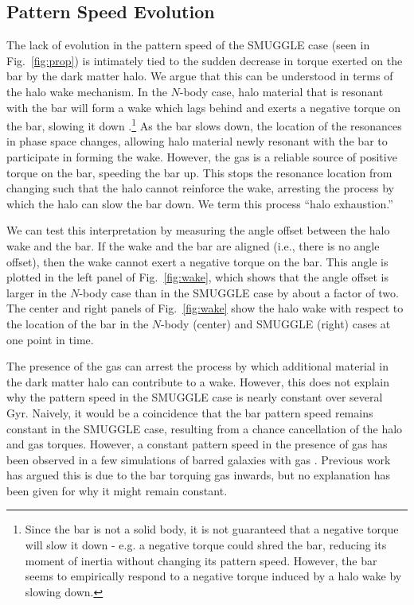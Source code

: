\documentclass[fleqn,usenatbib]{mnras}
\newcommand{\Nbody}{$N$-body}
\begin{document}
\subsection{Pattern Speed Evolution}
The lack of evolution in the pattern speed of the SMUGGLE case (seen in
Fig.~\ref{fig:prop}) is intimately tied to the sudden decrease in torque exerted
on the bar by the dark matter halo. We argue that this can be understood in
terms of the halo wake mechanism. In the \Nbody{} case, halo material that is
resonant with the bar will form a wake which lags behind and exerts a negative
torque on the bar, slowing it down \citep{1984MNRAS.209..729T,
1985MNRAS.213..451W, 1992ApJ...400...80H}.\footnote{Since the bar is not a solid
body, it is not guaranteed that a negative torque will slow it down - e.g. a
negative torque could shred the bar, reducing its moment of inertia without
changing its pattern speed. However, the bar seems to empirically respond to a
negative torque induced by a halo wake by slowing down.} As the bar slows down,
the location of the resonances in phase space changes, allowing halo material
newly resonant with the bar to participate in forming the wake. However, the gas
is a reliable source of positive torque on the bar, speeding the bar up. This
stops the resonance location from changing such that the halo cannot reinforce
the wake, arresting the process by which the halo can slow the bar down. We term
this process ``halo exhaustion.''

We can test this interpretation by measuring the angle offset between the halo
wake and the bar. If the wake and the bar are aligned (i.e., there is no angle
offset), then the wake cannot exert a negative torque on the bar. This angle
is plotted in the left panel of Fig.~\ref{fig:wake}, which shows that the
angle offset is larger in the \Nbody{} case than in the SMUGGLE case by about a
factor of two. The center and right panels of Fig.~\ref{fig:wake} show the halo
wake with respect to the location of the bar in the \Nbody{} (center) and SMUGGLE
(right) cases at one point in time.

The presence of the gas can arrest the process by which additional material in
the dark matter halo can contribute to a wake. However, this does not explain
why the pattern speed in the SMUGGLE case is nearly constant over several Gyr.
Naively, it would be a coincidence that the bar pattern speed remains constant
in the SMUGGLE case, resulting from a chance cancellation of the halo and gas
torques. However, a constant pattern speed in the presence of gas has been
observed in a few simulations of barred galaxies with
gas \citep{1993AA...268...65F, 2010ApJ...719.1470V, 2014MNRAS.438L..81A}. Previous
work has argued this is due to the bar torquing gas inwards, but no explanation
has been given for why it might remain constant.
\end{document}
